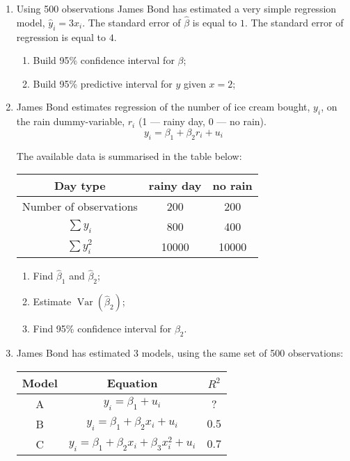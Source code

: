 \documentclass[12pt]{article}
\DeclareMathOperator{\Var}{Var}
\def \hb{\hat{\beta}}
\begin{document}
\begin{enumerate}

  \item Using 500 observations James Bond has estimated a very simple regression model, $\hat y_i = 3 x_i$. 
    The standard error of $\hb$ is equal to $1$. 
    The standard error of regression is equal to $4$. 
    \begin{enumerate}
      \item Build 95\% confidence interval for $\beta$;
      \item Build 95\% predictive interval for $y$ given $x=2$;
    \end{enumerate}

  \item James Bond estimates regression of the number of ice cream bought, $y_i$, on the rain dummy-variable, $r_i$ (1 — rainy day, 0 — no rain).
    \[
         y_i = \beta_1 + \beta_2 r_i + u_i
       \]

       The available data is summarised in the table below:

       \begin{tabular}{ccc}
	 \toprule
	 Day type &  rainy day & no rain \\
	 \midrule
	 Number of observations & 200 & 200 \\
	 $\sum y_i$ & 800 & 400 \\
	 $\sum y_i^2$ & 10000 & 10000 \\
	 \bottomrule
       \end{tabular}

       \begin{enumerate}
	 \item Find $\hb_1$ and $\hb_2$;
	 \item Estimate $\Var(\hb_2)$;
	 \item Find 95\% confidence interval for $\beta_2$.
       \end{enumerate}

  \item James Bond has estimated 3 models, using the same set of 500 observations:

   \begin{tabular}{ccc}
      \toprule
      Model & Equation & $R^2$  \\
      \midrule
      A & $y_i = \beta_1 + u_i$ & ?    \\
      B & $y_i = \beta_1 + \beta_2 x_i + u_i$ & $0.5$ \\
      C & $y_i = \beta_1 + \beta_2 x_i + \beta_3 x_i^2 + u_i $ & $0.7$ \\ 
      \bottomrule
    \end{tabular}


\end{enumerate}
\end{document}
